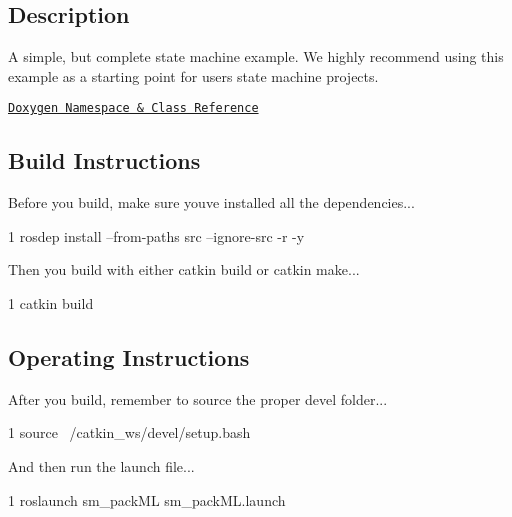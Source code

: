 \subsection*{Description}

A simple, but complete state machine example. We highly recommend using this example as a starting point for users state machine projects.~\newline


\href{https://reelrbtx.github.io/SMACC_Documentation/master/html/namespacesm__three__some.html}{\tt Doxygen Namespace \& Class Reference}

\subsection*{Build Instructions}

Before you build, make sure you\textquotesingle{}ve installed all the dependencies...


\begin{DoxyCode}
1 rosdep install --from-paths src --ignore-src -r -y 
\end{DoxyCode}


Then you build with either catkin build or catkin make...


\begin{DoxyCode}
1 catkin build
\end{DoxyCode}


\subsection*{Operating Instructions}

After you build, remember to source the proper devel folder...


\begin{DoxyCode}
1 source ~/catkin\_ws/devel/setup.bash
\end{DoxyCode}


And then run the launch file...


\begin{DoxyCode}
1 roslaunch sm\_packML sm\_packML.launch
\end{DoxyCode}
 